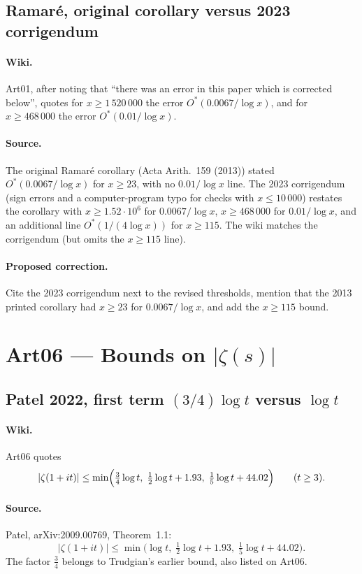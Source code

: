 \documentclass[11pt,a4paper]{article}
\begin{document}
\subsection{Ramaré, original corollary versus 2023 corrigendum}
\label{err:ramare-thresholds}
\paragraph{Wiki.}
Art01, after noting that ``there was an error in this paper which is
corrected below'', quotes for $x\ge 1\,520\,000$ the error
$O^*(0.0067/\log x)$, and for $x\ge 468\,000$ the error
$O^*(0.01/\log x)$.
\paragraph{Source.}
The original Ramaré corollary (Acta Arith.\ 159 (2013)) stated
$O^*(0.0067/\log x)$ for $x\ge 23$, with no $0.01/\log x$ line.
The 2023 corrigendum (sign errors and a computer-program typo for
checks with $x\le 10\,000$) restates the corollary with
$x\ge 1.52\cdot 10^6$ for $0.0067/\log x$, $x\ge 468\,000$ for
$0.01/\log x$, and an additional line $O^*(1/(4\log x))$ for
$x\ge 115$.  The wiki matches the corrigendum (but omits the
$x\ge 115$ line).
\paragraph{Proposed correction.}
Cite the 2023 corrigendum next to the revised thresholds, mention that
the 2013 printed corollary had $x\ge 23$ for $0.0067/\log x$, and add
the $x\ge 115$ bound.

\section{Art06 --- Bounds on $|\zeta(s)|$}

\subsection{Patel 2022, first term $(3/4)\log t$ versus $\log t$}
\label{err:patel-log}
\paragraph{Wiki.}
Art06 quotes
\[
|\zeta(1+it)|\le\min\Bigl(\tfrac34\log t,\;
\tfrac12\log t+1.93,\;\tfrac15\log t+44.02\Bigr)
\qquad(t\ge 3).
\]
\paragraph{Source.}
Patel, arXiv:2009.00769, Theorem~1.1:
\[
|\zeta(1+it)|\le\min\bigl(\log t,\;
\tfrac12\log t+1.93,\;\tfrac15\log t+44.02\bigr).
\]
The factor $\tfrac34$ belongs to Trudgian's earlier bound, also listed
on Art06.
\end{document}

